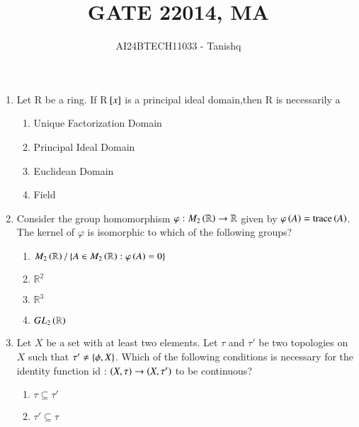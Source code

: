 \documentclass[journal]{IEEEtran}
\begin{document}

\vspace{3cm}
\author{AI24BTECH11033 - Tanishq}
\title{GATE 2}
{\let\newpage\relax\maketitle}
\title{2014, MA}
\renewcommand{\thefigure}{\theenumi}
\renewcommand{\thetable}{\theenumi}
\setlength{\intextsep}{10pt} %
\renewcommand{\thetable}{\theenumi}
\begin{enumerate}
  \item Let R be a ring. If R${}\left[x\right]$ is a principal ideal domain,then R is necessarily a
  \begin{enumerate}
      \item Unique Factorization Domain
      \item Principal Ideal Domain
      \item Euclidean Domain
      \item Field
  \end{enumerate}
  \item Consider the group homomorphism $\varphi : M_2\left(\mathbb{R}\right) \rightarrow \mathbb{R}$ given by $\varphi \left(A\right) = \text{trace}\left(A\right)$. The kernel of $\varphi$ is isomorphic to which of the following groups?
\begin{enumerate}
    \item $M_2\left(\mathbb{R}\right) / \left\{ A \in M_2\left(\mathbb{R}\right) : \varphi\left(A\right) = 0 \right\}$
    \item $\mathbb{R}^2$
    \item $\mathbb{R}^3$
    \item $GL_2\left(\mathbb{R}\right)$
\end{enumerate}
   \item Let $X$ be a set with at least two elements. Let $\tau$ and $\tau'$ be two topologies on $X$ such that $\tau' \neq  \left\{\phi , X\right\}$. Which of the following conditions is necessary for the identity function id : $\left(X , \tau\right) \rightarrow \left(X , \tau'\right)$ to be continuous? 
   \begin{enumerate}
      \item $\tau \subseteq \tau'$
      \item $\tau' \subseteq \tau$

\end{enumerate}
\end{enumerate}
\end{document}
